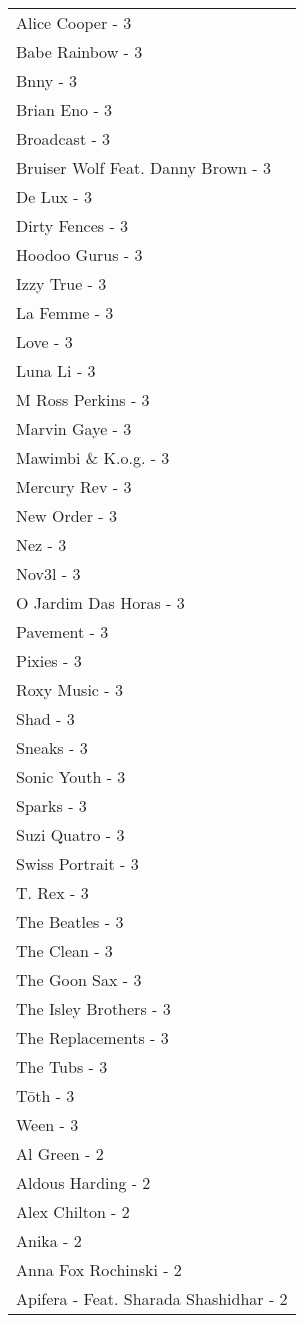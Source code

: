 \documentclass[
]{article}
\begin{document}
\begin{longtable}{l}
Alice Cooper - 3 \\ 
Babe Rainbow - 3 \\ 
Bnny - 3 \\ 
Brian Eno - 3 \\ 
Broadcast - 3 \\ 
Bruiser Wolf Feat. Danny Brown - 3 \\ 
De Lux - 3 \\ 
Dirty Fences - 3 \\ 
Hoodoo Gurus - 3 \\ 
Izzy True - 3 \\ 
La Femme - 3 \\ 
Love - 3 \\ 
Luna Li - 3 \\ 
M Ross Perkins - 3 \\ 
Marvin Gaye - 3 \\ 
Mawimbi \& K.o.g. - 3 \\ 
Mercury Rev - 3 \\ 
New Order - 3 \\ 
Nez - 3 \\ 
Nov3l - 3 \\ 
O Jardim Das Horas - 3 \\ 
Pavement - 3 \\ 
Pixies - 3 \\ 
Roxy Music - 3 \\ 
Shad - 3 \\ 
Sneaks - 3 \\ 
Sonic Youth - 3 \\ 
Sparks - 3 \\ 
Suzi Quatro - 3 \\ 
Swiss Portrait - 3 \\ 
T. Rex - 3 \\ 
The Beatles - 3 \\ 
The Clean - 3 \\ 
The Goon Sax - 3 \\ 
The Isley Brothers - 3 \\ 
The Replacements - 3 \\ 
The Tubs - 3 \\ 
Tōth - 3 \\ 
Ween - 3 \\ 
Al Green - 2 \\ 
Aldous Harding - 2 \\ 
Alex Chilton - 2 \\ 
Anika - 2 \\ 
Anna Fox Rochinski - 2 \\ 
Apifera - Feat. Sharada Shashidhar - 2 \\ 

\end{longtable}
\end{document}
